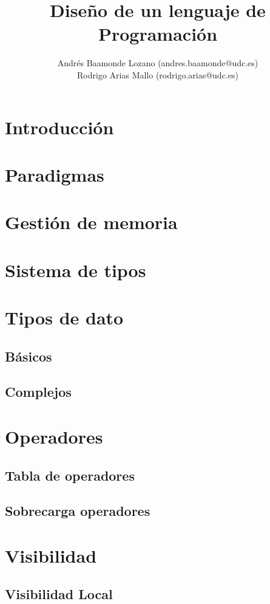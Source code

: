 \documentclass[12pt,a4paper]{article}
\title{Diseño de un lenguaje de Programación}
\author{Andrés Baamonde Lozano (andres.baamonde@udc.es)\\
	Rodrigo Arias Mallo (rodrigo.arias@udc.es)}
\begin{document}
\maketitle

\clearpage 

\tableofcontents

\clearpage 

\section{Introducción}
\section{Paradigmas}
\section{Gestión de memoria}
\section{Sistema de tipos}
\section{Tipos de dato}
\subsection{Básicos}
\subsection{Complejos}
\section{Operadores}
\subsection{Tabla de operadores}
\subsection{Sobrecarga operadores}
\section{Visibilidad}
\subsection{Visibilidad Local}
\end{document}
